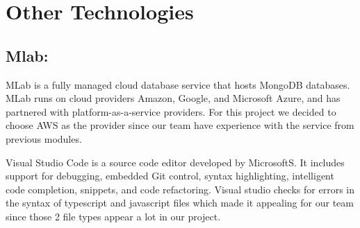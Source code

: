 \section{Other Technologies}

\subsection{Mlab:}
MLab is a fully managed cloud database service that hosts MongoDB databases. MLab runs on cloud providers Amazon, Google, and Microsoft Azure, and has partnered with platform-as-a-service providers. For this project we decided to choose AWS as the provider since our team have experience with the service from previous modules.\cite{MongoDBH41}

Visual Studio Code is a source code editor developed by MicrosoftS. It includes support for debugging, embedded Git control, syntax highlighting, intelligent code completion, snippets, and code refactoring. Visual studio checks for errors in the syntax of typescript and javascript files which made it appealing for our team since those 2 file types appear a lot in our project.\cite{VisualSt10}

